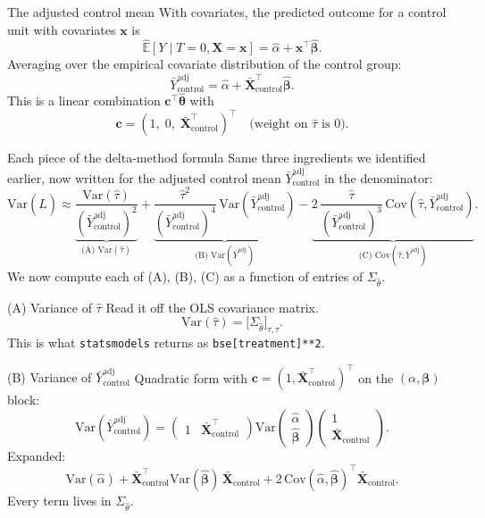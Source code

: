 \documentclass[10pt]{beamer}
\begin{document}
\begin{frame}{The adjusted control mean}
With covariates, the predicted outcome for a control unit with covariates $\mathbf{x}$ is
\[
\hat{\mathbb{E}}[Y \mid T=0, \mathbf{X}=\mathbf{x}] = \hat\alpha + \mathbf{x}^\top \hat{\bm\beta}.
\]
Averaging over the empirical covariate distribution of the control group:
\[
\boxed{\;\bar{Y}^{\text{adj}}_{\text{control}} = \hat\alpha + \bar{\mathbf{X}}_{\text{control}}^\top \hat{\bm\beta}.\;}
\]
This is a linear combination $\mathbf{c}^\top \hat{\bm\theta}$ with
\[
\mathbf{c} = (1,\; 0,\; \bar{\mathbf{X}}_{\text{control}}^\top)^\top
\quad\text{(weight on } \hat\tau \text{ is } 0\text{).}
\]
\end{frame}

\begin{frame}{Each piece of the delta-method formula}
Same three ingredients we identified earlier, now written for the adjusted control mean $\bar{Y}^{\text{adj}}_{\text{control}}$ in the denominator:
\[
\mathrm{Var}(\hat L) \approx
\underbrace{\frac{\mathrm{Var}(\hat\tau)}{(\bar{Y}^{\text{adj}}_{\text{control}})^2}}_{\text{(A) Var}(\hat\tau)}
+ \underbrace{\frac{\hat\tau^2}{(\bar{Y}^{\text{adj}}_{\text{control}})^4}\,\mathrm{Var}(\bar{Y}^{\text{adj}}_{\text{control}})}_{\text{(B) Var}(\bar Y^{\text{adj}})}
- \underbrace{2\,\frac{\hat\tau}{(\bar{Y}^{\text{adj}}_{\text{control}})^3}\,\mathrm{Cov}(\hat\tau,\bar{Y}^{\text{adj}}_{\text{control}})}_{\text{(C) Cov}(\hat\tau,\bar Y^{\text{adj}})}.
\]
We now compute each of (A), (B), (C) as a function of entries of $\Sigma_{\hat\theta}$.
\end{frame}

\begin{frame}{(A) Variance of $\hat\tau$}
Read it off the OLS covariance matrix.
\[
\mathrm{Var}(\hat\tau) = \big[\Sigma_{\hat\theta}\big]_{\tau,\tau}.
\]
This is what \texttt{statsmodels} returns as \texttt{bse[treatment]**2}.
\end{frame}

\begin{frame}{(B) Variance of $\bar{Y}^{\text{adj}}_{\text{control}}$}
Quadratic form with $\mathbf{c} = (1, \bar{\mathbf{X}}_{\text{control}}^\top)^\top$ on the $(\alpha, \bm\beta)$ block:
\[
\mathrm{Var}(\bar{Y}^{\text{adj}}_{\text{control}}) =
\begin{pmatrix} 1 & \bar{\mathbf{X}}_{\text{control}}^\top \end{pmatrix}
\mathrm{Var}\!\begin{pmatrix} \hat\alpha \\ \hat{\bm\beta} \end{pmatrix}
\begin{pmatrix} 1 \\ \bar{\mathbf{X}}_{\text{control}} \end{pmatrix}.
\]
Expanded:
\[
\mathrm{Var}(\hat\alpha)
+ \bar{\mathbf{X}}_{\text{control}}^\top \mathrm{Var}(\hat{\bm\beta})\,\bar{\mathbf{X}}_{\text{control}}
+ 2\,\mathrm{Cov}(\hat\alpha, \hat{\bm\beta})^\top \bar{\mathbf{X}}_{\text{control}}.
\]
Every term lives in $\Sigma_{\hat\theta}$.
\end{frame}
\end{document}
